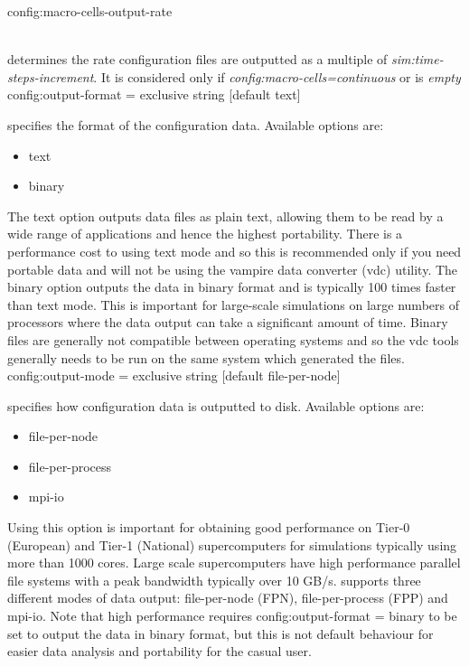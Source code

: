 {\zicf config:macro-cells-output-rate}\\
determines the rate configuration files are outputted as a multiple of \textit{sim:time-steps-increment}. It is considered only if \textit{config:macro-cells=continuous} or is \textit{empty}\\

{\zicf config:output-format = exclusive string [default text]}
specifies the format of the configuration data. Available options are:
\begin{itemize}
  \item[] text
  \item[] binary
\end{itemize}
The text option outputs data files as plain text, allowing them to be read by
a wide range of applications and hence the highest portability. There is a
performance cost to using text mode and so this is recommended only if you need
portable data and will not be using the vampire data converter (vdc) utility. The
binary option outputs the data in binary format and is typically 100 times
faster than text mode. This is important for large-scale simulations on large
numbers of processors where the data output can take a significant amount of
time. Binary files are generally not compatible between operating systems and so
the vdc tools generally needs to be run on the same system which generated the
files.\\

{\zicf config:output-mode = exclusive string [default file-per-node]}
specifies how configuration data is outputted to disk.
Available options are:
\begin{itemize}
  \item[] file-per-node
  \item[] file-per-process
  \item[] mpi-io
\end{itemize}
Using this option is important for obtaining good performance on Tier-0
(European) and Tier-1 (National) supercomputers for simulations typically using
more than 1000 cores. Large scale supercomputers have high performance parallel
file systems with a peak bandwidth typically over 10 GB/s. \vampire supports
three different modes of data output: file-per-node (FPN), file-per-process
(FPP) and mpi-io. Note that high performance requires
config:output-format = binary to be set to output the data in binary format, but
this is not default behaviour for easier data analysis and portability for the
casual user.

